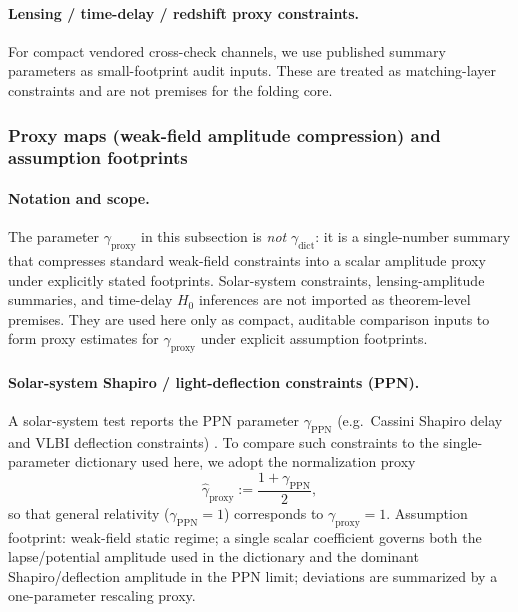 \paragraph{Lensing / time-delay / redshift proxy constraints.}
\InterfaceTag For compact vendored cross-check channels, we use published summary parameters as small-footprint audit inputs.
These are treated as matching-layer constraints and are not premises for the folding core.

\subsubsection{Proxy maps (weak-field amplitude compression) and assumption footprints}
\label{subsec:gamma_crossobs_maps}

\paragraph{Notation and scope.}
\InterfaceTag The parameter $\gamma_{\mathrm{proxy}}$ in this subsection is \emph{not} $\gamma_{\mathrm{dict}}$:
it is a single-number summary that compresses standard weak-field constraints into a scalar amplitude proxy under explicitly stated footprints.
\MatchTag Solar-system constraints, lensing-amplitude summaries, and time-delay $H_0$ inferences are not imported as theorem-level premises.
They are used here only as compact, auditable comparison inputs to form proxy estimates for $\gamma_{\mathrm{proxy}}$ under explicit assumption footprints.

\paragraph{Solar-system Shapiro / light-deflection constraints (PPN).}
\MatchTag A solar-system test reports the PPN parameter $\gamma_{\mathrm{PPN}}$ (e.g.\ Cassini Shapiro delay and VLBI deflection constraints)
\cite{BertottiIessTortora2003,FomalontKopeikin2009}.
To compare such constraints to the single-parameter dictionary used here, we adopt the normalization proxy
\[
\widehat\gamma_{\mathrm{proxy}}:=\frac{1+\gamma_{\mathrm{PPN}}}{2},
\]
so that general relativity ($\gamma_{\mathrm{PPN}}=1$) corresponds to $\gamma_{\mathrm{proxy}}=1$.
\AuditTag Assumption footprint: weak-field static regime; a single scalar coefficient governs both the lapse/potential amplitude used in the
dictionary and the dominant Shapiro/deflection amplitude in the PPN limit; deviations are summarized by a one-parameter rescaling proxy.


